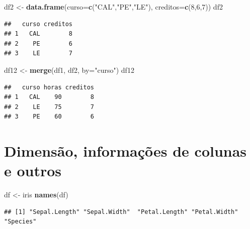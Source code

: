 \documentclass[
]{book}
\newenvironment{Shaded}{\begin{snugshade}}{\end{snugshade}}
\newcommand{\AttributeTok}[1]{\textcolor[rgb]{0.13,0.29,0.53}{#1}}
\newcommand{\DecValTok}[1]{\textcolor[rgb]{0.00,0.00,0.81}{#1}}
\newcommand{\FunctionTok}[1]{\textcolor[rgb]{0.13,0.29,0.53}{\textbf{#1}}}
\newcommand{\NormalTok}[1]{#1}
\newcommand{\OtherTok}[1]{\textcolor[rgb]{0.56,0.35,0.01}{#1}}
\newcommand{\SpecialCharTok}[1]{\textcolor[rgb]{0.81,0.36,0.00}{\textbf{#1}}}
\newcommand{\StringTok}[1]{\textcolor[rgb]{0.31,0.60,0.02}{#1}}
\theoremstyle{definition}
\theoremstyle{definition}
\theoremstyle{definition}
\theoremstyle{definition}
\theoremstyle{remark}
\begin{document}
\begin{Shaded}
\begin{Highlighting}[]
\NormalTok{df2 }\OtherTok{\textless{}{-}} \FunctionTok{data.frame}\NormalTok{(}\AttributeTok{curso=}\FunctionTok{c}\NormalTok{(}\StringTok{"CAL"}\NormalTok{,}\StringTok{"PE"}\NormalTok{,}\StringTok{"LE"}\NormalTok{), }\AttributeTok{creditos=}\FunctionTok{c}\NormalTok{(}\DecValTok{8}\NormalTok{,}\DecValTok{6}\NormalTok{,}\DecValTok{7}\NormalTok{))}
\NormalTok{df2 }
\end{Highlighting}
\end{Shaded}

\begin{verbatim}
##   curso creditos
## 1   CAL        8
## 2    PE        6
## 3    LE        7
\end{verbatim}

\begin{Shaded}
\begin{Highlighting}[]
\NormalTok{df12 }\OtherTok{\textless{}{-}} \FunctionTok{merge}\NormalTok{(df1, df2, }\AttributeTok{by=}\StringTok{"curso"}\NormalTok{)}
\NormalTok{df12}
\end{Highlighting}
\end{Shaded}

\begin{verbatim}
##   curso horas creditos
## 1   CAL    90        8
## 2    LE    75        7
## 3    PE    60        6
\end{verbatim}

\section{Dimensão, informações de colunas e outros}\label{dimensuxe3o-informauxe7uxf5es-de-colunas-e-outros}

\begin{Shaded}
\begin{Highlighting}[]
\NormalTok{df }\OtherTok{\textless{}{-}}\NormalTok{ iris}
\FunctionTok{names}\NormalTok{(df)}
\end{Highlighting}
\end{Shaded}

\begin{verbatim}
## [1] "Sepal.Length" "Sepal.Width"  "Petal.Length" "Petal.Width"  "Species"
\end{verbatim}

\begin{Shaded}
\end{Shaded}
\end{document}
